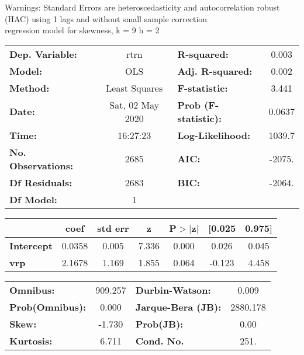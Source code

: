 Warnings: \newline
 [1] Standard Errors are heteroscedasticity and autocorrelation robust (HAC) using 1 lags and without small sample correction\\ 

regression model for skewness, k = 9 h = 2\begin{center}
\begin{tabular}{lclc}
\toprule
\textbf{Dep. Variable:}    &       rtrn       & \textbf{  R-squared:         } &     0.003   \\
\textbf{Model:}            &       OLS        & \textbf{  Adj. R-squared:    } &     0.002   \\
\textbf{Method:}           &  Least Squares   & \textbf{  F-statistic:       } &     3.441   \\
\textbf{Date:}             & Sat, 02 May 2020 & \textbf{  Prob (F-statistic):} &   0.0637    \\
\textbf{Time:}             &     16:27:23     & \textbf{  Log-Likelihood:    } &    1039.7   \\
\textbf{No. Observations:} &        2685      & \textbf{  AIC:               } &    -2075.   \\
\textbf{Df Residuals:}     &        2683      & \textbf{  BIC:               } &    -2064.   \\
\textbf{Df Model:}         &           1      & \textbf{                     } &             \\
\bottomrule
\end{tabular}
\begin{tabular}{lcccccc}
                   & \textbf{coef} & \textbf{std err} & \textbf{z} & \textbf{P$> |$z$|$} & \textbf{[0.025} & \textbf{0.975]}  \\
\midrule
\textbf{Intercept} &       0.0358  &        0.005     &     7.336  &         0.000        &        0.026    &        0.045     \\
\textbf{vrp}       &       2.1678  &        1.169     &     1.855  &         0.064        &       -0.123    &        4.458     \\
\bottomrule
\end{tabular}
\begin{tabular}{lclc}
\textbf{Omnibus:}       & 909.257 & \textbf{  Durbin-Watson:     } &    0.009  \\
\textbf{Prob(Omnibus):} &   0.000 & \textbf{  Jarque-Bera (JB):  } & 2880.178  \\
\textbf{Skew:}          &  -1.730 & \textbf{  Prob(JB):          } &     0.00  \\
\textbf{Kurtosis:}      &   6.711 & \textbf{  Cond. No.          } &     251.  \\
\bottomrule
\end{tabular}
\end{center}

